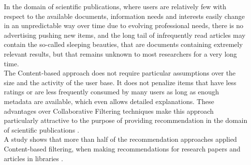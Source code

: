 \documentclass[\myFontSize,a4paper,oneside,english,hidelinks]{article}
\begin{document}
%
%
%
In the domain of scientific publications, where users are relatively few with respect to the available documents, information needs and interests easily change in an unpredictable way over time due to evolving professional needs, there is no advertising pushing new items, and the long tail of infrequently read articles may contain the so-called sleeping beauties, that are documents containing extremely relevant results, but that remains unknown to most researchers for a very long time. \\
The Content-based approach does not require particular assumptions over the size and the activity of the user base. It does not penalize items that have less ratings or are less frequently consumed by many users as long as enough metadata are available, which even allows detailed explanations. These advantages over Collaborative Filtering techniques make this approach particularly attractive to the purpose of providing recommendation in the domain of scientific publications \cite{De_Nart201484}. \\
%
A study shows that more than half of the recommendation approaches applied Content-based filtering, when making recommendations for research papers and articles in libraries \cite{Beel2016305}. \\
%





\end{document}
